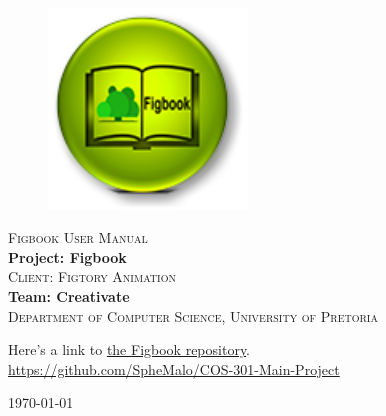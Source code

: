 \begin{titlepage}
	\begin{center}
		
		\begin{figure}[t]
			\centering
			\includegraphics[width=200px]{images/figbooklogo-u216.png}
		\end{figure}
		
		\textsc{\Huge Figbook User Manual} \\ 
		\vspace{2cm}
		\textbf{\Large Project: Figbook} \\ 
		\textsc{\small Client: Figtory Animation} \\ 
		\vspace{2cm}
		\textbf{\large Team: Creativate } \\ 
		
		\textsc{\small Department of Computer Science, University of Pretoria}
		
		\vfill
		
	Here's a link to \href{https://github.com/SpheMalo/COS-301-Main-Project}{the Figbook repository}.\\
	\url{https://github.com/SpheMalo/COS-301-Main-Project}

	\vfill

	{\large \today}	
	
		
		
	\end{center}
\end{titlepage}
